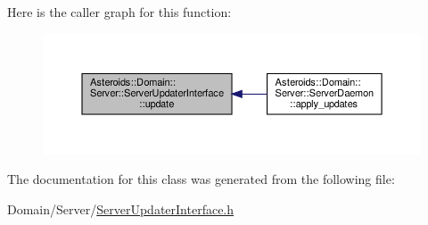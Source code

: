 Here is the caller graph for this function\+:\nopagebreak
\begin{figure}[H]
\begin{center}
\leavevmode
\includegraphics[width=350pt]{classAsteroids_1_1Domain_1_1Server_1_1ServerUpdaterInterface_a361160b4683c46d96833943873de0c2c_icgraph}
\end{center}
\end{figure}


The documentation for this class was generated from the following file\+:\begin{DoxyCompactItemize}
\item 
Domain/\+Server/\hyperlink{ServerUpdaterInterface_8h}{Server\+Updater\+Interface.\+h}\end{DoxyCompactItemize}
